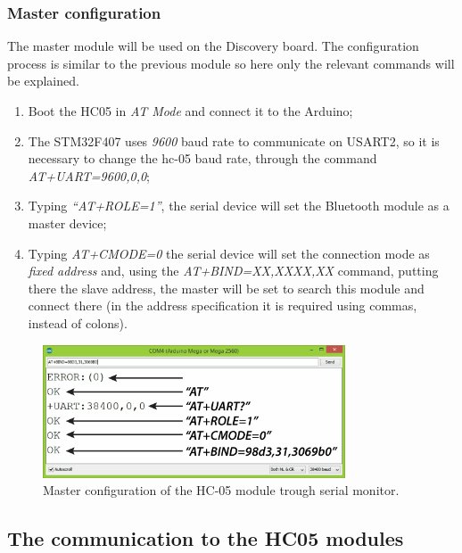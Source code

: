 \subsubsection{Master configuration}
The master module will be used on the Discovery board. The configuration process is similar to the previous module so here only the relevant commands will be explained.\\
\begin{enumerate}
	\item Boot the HC05 in \textit{AT Mode} and connect it to the Arduino;
	\item The STM32F407 uses \textit{9600} baud rate to communicate on USART2, so it is necessary to change the hc-05 baud rate, through the command \textit{AT+UART=9600,0,0};
	\item Typing \textit{“AT+ROLE=1”}, the serial device will set the Bluetooth module as a master device;
	\item Typing \textit{AT+CMODE=0} the serial device will set the connection mode as \textit{fixed address} and, using the \textit{AT+BIND=XX,XXXX,XX} command, putting there the slave address, the master will be set to search this module and connect there (in the address specification it is required using commas, instead of colons).
\end{enumerate}

\begin{figure}[H]
	\hspace*{0.1 \textwidth}\includegraphics[width= 0.8\textwidth]
	{files/images/hc05_master}
	\caption{Master configuration of the HC-05 module trough serial monitor.}
\end{figure}
 \newpage
 
 \subsection{The communication to the HC05 modules}
 

